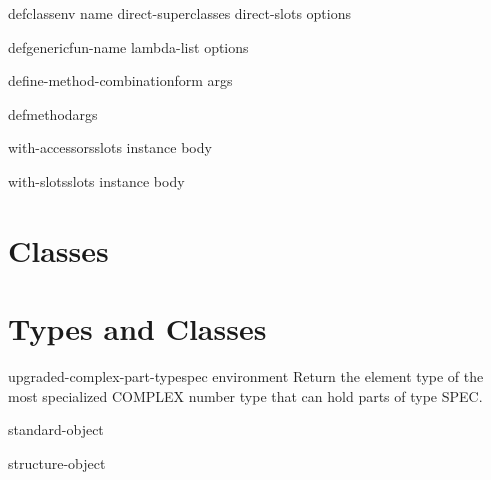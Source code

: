 \begin{macro}{defclass}{\env env name direct-superclasses direct-slots \rest options}{}{}
  
\end{macro}

\begin{macro}{defgeneric}{fun-name lambda-list \body options}{}{}
  
\end{macro}

\begin{macro}{define-method-combination}{\whole form \rest args}{}{}
  
\end{macro}

\begin{macro}{defmethod}{\rest args}{}{}
  
\end{macro}

\begin{macro}{with-accessors}{slots instance \body body}{}{}
  
\end{macro}

\begin{macro}{with-slots}{slots instance \body body}{}{}
  
\end{macro}

\section{Classes}

\section{Types and Classes}

\begin{function}{upgraded-complex-part-type}{spec \op environment}{}{}
  Return the element type of the most specialized COMPLEX number type that
   can hold parts of type SPEC.
\end{function}

\begin{class}{standard-object}{}{}{}
  
\end{class}

\begin{class}{structure-object}{}{}{}
  
\end{class}

